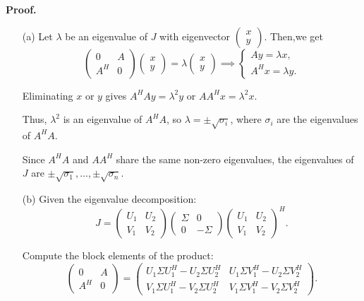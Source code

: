 \documentclass[a4paper, 11pt]{article}
\newenvironment{solution}
    {\textbf{Proof.}}
    {}
\begin{document}
\begin{solution}
		\begin{enumerate}
		\item[(a)] 
	Let \(\lambda\) be an eigenvalue of \(J\) with eigenvector \(\begin{pmatrix} x \\ y \end{pmatrix}\). Then,we get
	$$
	\begin{pmatrix} 0 & A \\ A^H & 0 \end{pmatrix} \begin{pmatrix} x \\ y \end{pmatrix} = \lambda \begin{pmatrix} x \\ y \end{pmatrix} \implies 
	\begin{cases} 
		Ay = \lambda x, \\ 
		A^H x = \lambda y. 
	\end{cases}
	$$
	
	Eliminating \(x\) or \(y\) gives \(A^H A y = \lambda^2 y\) or \(A A^H x = \lambda^2 x\). 
	
	Thus, \(\lambda^2\) is an eigenvalue of \(A^H A\), so \(\lambda = \pm \sqrt{\sigma_i}\), where \(\sigma_i\) are the eigenvalues of \(A^H A\). 
	
	Since \(A^H A\) and \(A A^H\) share the same non-zero eigenvalues, the eigenvalues of \(J\) are \(\pm \sqrt{\sigma_1}, \ldots, \pm \sqrt{\sigma_n}\).
	
		\item[(b)] 
	Given the eigenvalue decomposition:
	$$
	J = \begin{pmatrix} U_1 & U_2 \\ V_1 & V_2 \end{pmatrix} \begin{pmatrix} \Sigma & 0 \\ 0 & -\Sigma \end{pmatrix} \begin{pmatrix} U_1 & U_2 \\ V_1 & V_2 \end{pmatrix}^H.
	$$
	
	Compute the block elements of the product:
	$$
	\begin{pmatrix} 0 & A \\ A^H & 0 \end{pmatrix} = \begin{pmatrix} 
		U_1 \Sigma U_1^H - U_2 \Sigma U_2^H & U_1 \Sigma V_1^H - U_2 \Sigma V_2^H \\
		V_1 \Sigma U_1^H - V_2 \Sigma U_2^H & V_1 \Sigma V_1^H - V_2 \Sigma V_2^H 
	\end{pmatrix}.
	$$
	

\end{enumerate}
\end{solution}
\end{document}
